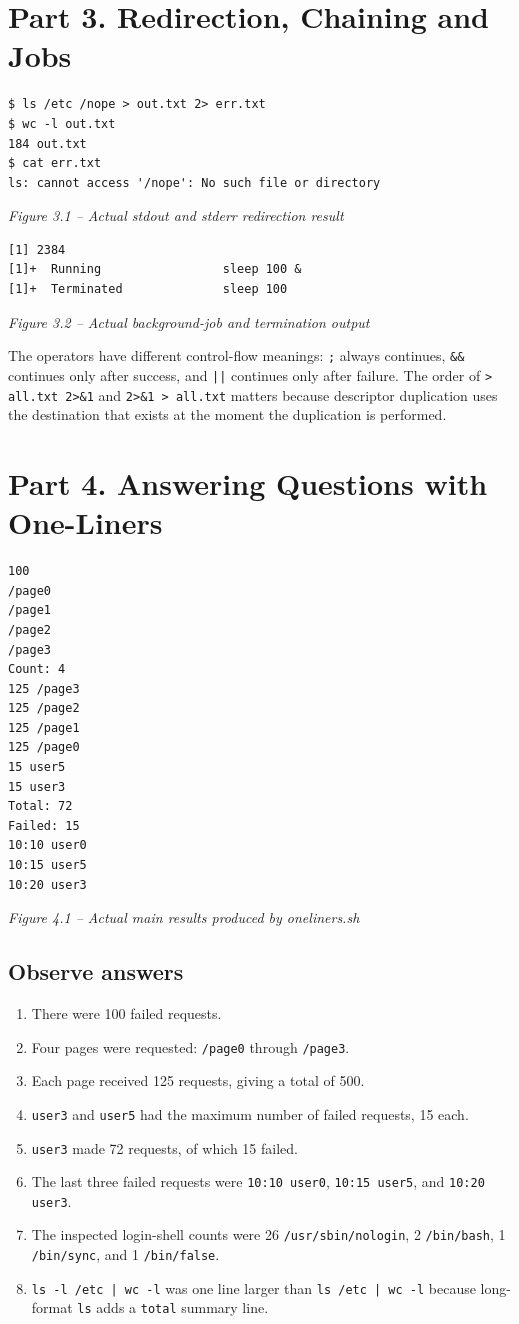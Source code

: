 \documentclass[12pt,a4paper]{article}
\newcommand{\figcap}[1]{\begin{center}\small\textit{#1}\end{center}\vspace{0.4em}}
\begin{document}
\section{Part 3. Redirection, Chaining and Jobs}
\begin{lstlisting}
$ ls /etc /nope > out.txt 2> err.txt
$ wc -l out.txt
184 out.txt
$ cat err.txt
ls: cannot access '/nope': No such file or directory
\end{lstlisting}
\figcap{Figure 3.1 -- Actual stdout and stderr redirection result}

\begin{lstlisting}
[1] 2384
[1]+  Running                 sleep 100 &
[1]+  Terminated              sleep 100
\end{lstlisting}
\figcap{Figure 3.2 -- Actual background-job and termination output}

The operators have different control-flow meanings: \texttt{;} always continues, \texttt{\&\&} continues only after success, and \texttt{||} continues only after failure. The order of \texttt{> all.txt 2>\&1} and \texttt{2>\&1 > all.txt} matters because descriptor duplication uses the destination that exists at the moment the duplication is performed.

\section{Part 4. Answering Questions with One-Liners}
\begin{lstlisting}
100
/page0
/page1
/page2
/page3
Count: 4
125 /page3
125 /page2
125 /page1
125 /page0
15 user5
15 user3
Total: 72
Failed: 15
10:10 user0
10:15 user5
10:20 user3
\end{lstlisting}
\figcap{Figure 4.1 -- Actual main results produced by oneliners.sh}

\subsection{Observe answers}
\begin{enumerate}[label=\arabic*.]
\item There were 100 failed requests.
\item Four pages were requested: \texttt{/page0} through \texttt{/page3}.
\item Each page received 125 requests, giving a total of 500.
\item \texttt{user3} and \texttt{user5} had the maximum number of failed requests, 15 each.
\item \texttt{user3} made 72 requests, of which 15 failed.
\item The last three failed requests were \texttt{10:10 user0}, \texttt{10:15 user5}, and \texttt{10:20 user3}.
\item The inspected login-shell counts were 26 \texttt{/usr/sbin/nologin}, 2 \texttt{/bin/bash}, 1 \texttt{/bin/sync}, and 1 \texttt{/bin/false}.
\item \texttt{ls -l /etc | wc -l} was one line larger than \texttt{ls /etc | wc -l} because long-format \texttt{ls} adds a \texttt{total} summary line.
\end{enumerate}
\end{document}
